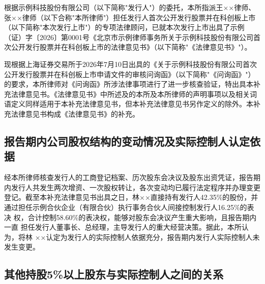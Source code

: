 \documentclass[zihao=-4]{ctexart}
\begin{document}
\opLetterhead
\opLetterTitle


根据示例科技股份有限公司（以下简称"发行人"）的委托，本所指派王××律师、
张××律师（以下合称"本所律师"）担任发行人首次公开发行股票并在科创板上市
（以下简称"本次发行上市"）的专项法律顾问，已就本次发行上市出具了示例
（证）字〔2026〕第0001号《北京市示例律师事务所关于示例科技股份有限公司首
次公开发行股票并在科创板上市的法律意见书》（以下简称"《法律意见书》"）。

现根据上海证券交易所于2026年7月10日出具的《关于示例科技股份有限公司首次
公开发行股票并在科创板上市申请文件的审核问询函》（以下简称"《问询函》"）
的要求，本所律师对《问询函》所涉法律事项进行了进一步核查验证，特出具本补
充法律意见书。《法律意见书》中所述及的本所及本所律师的声明事项以及相关词
语定义同样适用于本补充法律意见书，但本补充法律意见书另作定义的除外。本补
充法律意见书构成《法律意见书》的补充。


\opReply

\subsection{报告期内公司股权结构的变动情况及实际控制人认定依据}

经本所律师核查发行人的工商登记档案、历次股东会决议及股东出资凭证，报告期
内发行人共发生两次增资、一次股权转让，各次变动均已履行法定程序并办理变更
登记。截至本补充法律意见书出具之日，林××直接持有发行人42.35\%的股份，并
通过担任示例合伙企业（有限合伙）执行事务合伙人间接控制发行人16.25\%的表决
权，合计控制58.60\%的表决权，能够对股东会决议产生重大影响，且报告期内一直
担任发行人董事长、总经理，主导发行人的重大经营决策。据此，本所认为，将林
××认定为发行人的实际控制人依据充分，报告期内发行人实际控制人未发生变更。

\subsection{其他持股5\%以上股东与实际控制人之间的关系}
\end{document}
